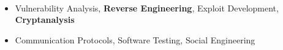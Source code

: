 \\[\lsep]

\begin{itemize}
	\itemsep-0.25em
	\item \noindent Vulnerability Analysis, \textbf{Reverse Engineering}, Exploit Development, \textbf{Cryptanalysis}
	\item \noindent Communication Protocols, Software Testing, Social Engineering
\end{itemize}

